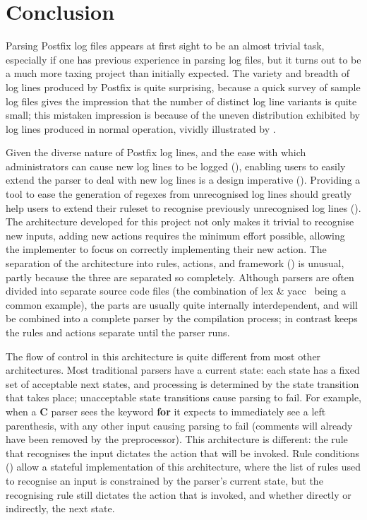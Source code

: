 \chapter{Conclusion}

\label{conclusion}

Parsing Postfix log files appears at first sight to be an almost trivial
task, especially if one has previous experience in parsing log files, but
it turns out to be a much more taxing project than initially expected.  The
variety and breadth of log lines produced by Postfix is quite surprising,
because a quick survey of sample log files gives the impression that the
number of distinct log line variants is quite small; this mistaken
impression is because of the uneven distribution exhibited by log lines
produced in normal operation, vividly illustrated by .


Given the diverse nature of Postfix log lines, and the ease with which
administrators can cause new log lines to be logged (), enabling users to easily extend the parser to deal with new
log lines is a design imperative ().  Providing a
tool to ease the generation of regexes from unrecognised log lines should
greatly help users to extend their ruleset to recognise previously
unrecognised log lines ().
The architecture developed for this project not only makes it trivial to
recognise new inputs, adding new actions requires the minimum effort
possible, allowing the implementer to focus on correctly implementing their
new action.  The separation of the architecture into rules, actions, and
framework () is unusual, partly because the three
are separated so completely.  Although parsers are often divided into
separate source code files (the combination of lex \&
yacc~\cite{lex-and-yacc-book} being a common example), the parts are
usually quite internally interdependent, and will be combined into a
complete parser by the compilation process; in contrast \parsername{} keeps
the rules and actions separate until the parser runs.

The flow of control in this architecture is quite different from most other
architectures.  Most traditional parsers have a current state: each state
has a fixed set of acceptable next states, and processing is determined by
the state transition that takes place; unacceptable state transitions cause
parsing to fail.  For example, when a \textbf{C} parser sees the keyword
\textbf{for} it expects to immediately see a left parenthesis, with any
other input causing parsing to fail (comments will already have been
removed by the preprocessor).  This architecture is different: the rule
that recognises the input dictates the action that will be invoked.  Rule
conditions () allow a stateful
implementation of this architecture, where the list of rules used to
recognise an input is constrained by the parser's current state, but the
recognising rule still dictates the action that is invoked, and whether
directly or indirectly, the next state.


